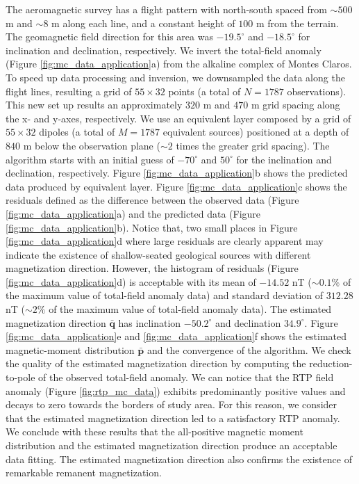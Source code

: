 The aeromagnetic survey has a flight pattern with north-south spaced from $\sim 500$ m and $ \sim 8$ m along each line, and a constant height of $100$ m from the terrain. The geomagnetic field direction for this area was $-19.5^\circ$ and $-18.5^\circ$ for inclination and declination, respectively. We invert the total-field anomaly (Figure \ref{fig:mc_data_application}a) from the alkaline complex of Montes Claros. To speed up data processing and inversion, we downsampled the data along the flight lines, resulting a grid of $55 \times 32$ points (a total of $N=1787$ observations). This new set up results an approximately $320$ m and $470$ m grid spacing along the x- and y-axes, respectively. We use an equivalent layer composed by a grid of $55 \times 32$ dipoles (a total of $M=1787$ equivalent sources) positioned at a depth of $840$ m below the observation plane ($\sim 2$ times the greater grid spacing). The algorithm starts with an initial guess of $-70^\circ$ and $50^\circ$ for the inclination and declination, respectively. Figure \ref{fig:mc_data_application}b shows the predicted data produced by equivalent layer. Figure \ref{fig:mc_data_application}c shows the residuals defined as the difference between the observed data (Figure \ref{fig:mc_data_application}a) and the predicted data (Figure \ref{fig:mc_data_application}b). Notice that, two small places in Figure \ref{fig:mc_data_application}d where large residuals are clearly apparent may indicate the existence of shallow-seated geological sources with different magnetization direction. However, the histogram of residuals (Figure \ref{fig:mc_data_application}d) is acceptable with its mean of $-14.52$ nT ($\sim 0.1\% $ of the maximum value of total-field anomaly data) and standard deviation of $312.28$ nT ($\sim 2 \% $ of the maximum value of total-field anomaly data). The estimated magnetization direction $\bar{\mathbf{q}}$ has inclination $-50.2^\circ$ and declination $34.9^\circ$. Figure \ref{fig:mc_data_application}e and \ref{fig:mc_data_application}f shows the estimated magnetic-moment distribution $\bar{\mathbf{p}}$ and the convergence of the algorithm. We check the quality of the estimated magnetization direction by computing the reduction-to-pole of the observed total-field anomaly. We can notice that the RTP field anomaly (Figure \ref{fig:rtp_mc_data}) exhibits predominantly positive values and decays to zero towards the borders of study area. For this reason, we consider that the estimated magnetization direction led to a satisfactory RTP anomaly. We conclude with these results that the all-positive magnetic moment distribution and the estimated magnetization direction produce an acceptable data fitting. The estimated magnetization direction also confirms the existence of remarkable remanent magnetization. 


